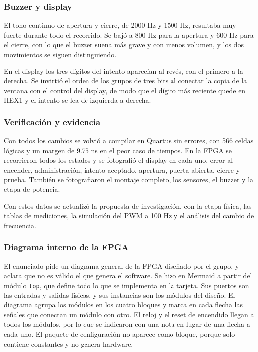 \documentclass[11pt,letterpaper]{article}
\begin{document}
\subsubsection*{Buzzer y display}

El tono continuo de apertura y cierre, de 2000 Hz y 1500 Hz, resultaba muy fuerte durante todo el recorrido. Se bajó a 800 Hz para la apertura y 600 Hz para el cierre, con lo que el buzzer suena más grave y con menos volumen, y los dos movimientos se siguen distinguiendo.

En el display los tres dígitos del intento aparecían al revés, con el primero a la derecha. Se invirtió el orden de los grupos de tres bits al conectar la copia de la ventana con el control del display, de modo que el dígito más reciente quede en HEX1 y el intento se lea de izquierda a derecha.

\subsubsection*{Verificación y evidencia}

Con todos los cambios se volvió a compilar en Quartus sin errores, con 566 celdas lógicas y un margen de 9.76 ns en el peor caso de tiempos. En la FPGA se recorrieron todos los estados y se fotografió el display en cada uno, error al encender, administración, intento aceptado, apertura, puerta abierta, cierre y prueba. También se fotografiaron el montaje completo, los sensores, el buzzer y la etapa de potencia.

Con estos datos se actualizó la propuesta de investigación, con la etapa física, las tablas de mediciones, la simulación del PWM a 100 Hz y el análisis del cambio de frecuencia.

\subsubsection*{Diagrama interno de la FPGA}

El enunciado pide un diagrama general de la FPGA diseñado por el grupo, y aclara que no es válido el que genera el software. Se hizo en Mermaid a partir del módulo \texttt{top}, que define todo lo que se implementa en la tarjeta. Sus puertos son las entradas y salidas físicas, y sus instancias son los módulos del diseño. El diagrama agrupa los módulos en los cuatro bloques y marca en cada flecha las señales que conectan un módulo con otro. El reloj y el reset de encendido llegan a todos los módulos, por lo que se indicaron con una nota en lugar de una flecha a cada uno. El paquete de configuración no aparece como bloque, porque solo contiene constantes y no genera hardware.
\end{document}
